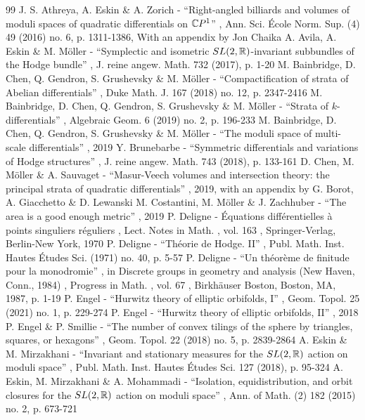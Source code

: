 \documentclass[11pt]{article}
\numberwithin{equation}{section}
\theoremstyle{plain}
\theoremstyle{definition}
\begin{document}
\begin{thebibliography}{99}
 J. S. Athreya, A. Eskin \& A. Zorich - “Right-angled billiards and volumes of moduli spaces of quadratic differentials on $\mathbb{C}\rm P^1$” , Ann. Sci. École Norm. Sup. (4) 49 (2016) no. 6, p. 1311-1386, With an appendix by Jon Chaika
 A. Avila, A. Eskin \& M. Möller - “Symplectic and isometric ${\rm SL}(2,\mathbb{R})$-invariant subbundles of the Hodge bundle” , J. reine angew. Math. 732 (2017), p. 1-20
 M. Bainbridge, D. Chen, Q. Gendron, S. Grushevsky \& M. Möller - “Compactification of strata of Abelian differentials” , Duke Math. J. 167 (2018) no. 12, p. 2347-2416
 M. Bainbridge, D. Chen, Q. Gendron, S. Grushevsky \& M. Möller - “Strata of $k$-differentials” , Algebraic Geom. 6 (2019) no. 2, p. 196-233
 M. Bainbridge, D. Chen, Q. Gendron, S. Grushevsky \& M. Möller - “The moduli space of multi-scale differentials” , 2019
 Y. Brunebarbe - “Symmetric differentials and variations of Hodge structures” , J. reine angew. Math. 743 (2018), p. 133-161
 D. Chen, M. Möller \& A. Sauvaget - “Masur-Veech volumes and intersection theory: the principal strata of quadratic differentials” , 2019, with an appendix by G. Borot, A. Giacchetto \& D. Lewanski
 M. Costantini, M. Möller \& J. Zachhuber - “The area is a good enough metric” , 2019
 P. Deligne - Équations différentielles à points singuliers réguliers , Lect. Notes in Math. , vol. 163 , Springer-Verlag, Berlin-New York, 1970
 P. Deligne - “Théorie de Hodge. II” , Publ. Math. Inst. Hautes Études Sci. (1971) no. 40, p. 5-57
 P. Deligne - “Un théorème de finitude pour la monodromie” , in Discrete groups in geometry and analysis (New Haven, Conn., 1984) , Progress in Math. , vol. 67 , Birkhäuser Boston, Boston, MA, 1987, p. 1-19
 P. Engel - “Hurwitz theory of elliptic orbifolds, I” , Geom. Topol. 25 (2021) no. 1, p. 229-274
 P. Engel - “Hurwitz theory of elliptic orbifolds, II” , 2018
 P. Engel \& P. Smillie - “The number of convex tilings of the sphere by triangles, squares, or hexagons” , Geom. Topol. 22 (2018) no. 5, p. 2839-2864
 A. Eskin \& M. Mirzakhani - “Invariant and stationary measures for the ${\rm SL}(2,\mathbb{R})$ action on moduli space” , Publ. Math. Inst. Hautes Études Sci. 127 (2018), p. 95-324
 A. Eskin, M. Mirzakhani \& A. Mohammadi - “Isolation, equidistribution, and orbit closures for the ${\rm SL}(2,\mathbb{R})$ action on moduli space” , Ann. of Math. (2) 182 (2015) no. 2, p. 673-721

\end{thebibliography}
\end{document}
